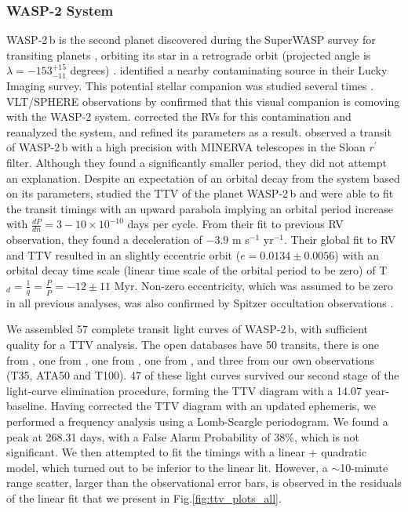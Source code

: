 \documentclass[a4paper,fleqn,usenatbib]{mnras}
\begin{document}
\subsubsection{WASP-2 System}
WASP-2\,b is the second planet discovered during the SuperWASP survey for transiting planets \citep{2007MNRAS.375..951C}, orbiting its star in a retrograde orbit (projected angle is $\lambda = -153^{+15}_{-11}$ degrees) \citep{2010A&A...524A..25T}. \cite{2009A&A...498..567D} identified a nearby contaminating source in their Lucky Imaging survey. This potential stellar companion was studied several times \citep{2013MNRAS.428..182B, 2015ApJ...800..138N,2015ApJ...814..148P, 2015A&A...575A..23W, 2016A&A...589A..58E}. VLT/SPHERE observations by \cite{2020A&A...635A..73B} confirmed that this visual companion is comoving with the WASP-2 system. \cite{2020A&A...635A..74S} corrected the RVs for this contamination and reanalyzed the system, and refined its parameters as a result. \cite{2019PASP..131k5003A} observed a transit of WASP-2\,b with a high precision with MINERVA telescopes in the Sloan $r^{\prime}$ filter. Although they found a significantly smaller period, they did not attempt an explanation. Despite an expectation of an orbital decay from the system based on its parameters, \cite{2019MNRAS.490.1294B} studied the TTV of the planet WASP-2\,b and were able to fit the transit timings with an upward parabola implying an orbital period increase with $\frac{dP}{dn} = 3 - 10 \times 10^{-10}$ days per cycle. From their fit to previous RV observation, they found a deceleration of $-3.9$ m s$^{-1}$ yr$^{-1}$. Their global fit to RV and TTV resulted in an slightly eccentric orbit  ($e = 0.0134 \pm 0.0056$) with an orbital decay time scale (linear time scale of the orbital period to be zero) of T$_{d} = \frac{1}{q} = \frac{P}{\dot P} = -12 \pm 11$ Myr. Non-zero eccentricity, which was assumed to be zero in all previous analyses, was also confirmed by Spitzer occultation observations \citep{2010arXiv1004.0836W}.

We assembled 57 complete transit light curves of WASP-2\,b, with sufficient quality for a TTV analysis. The open databases have 50 transits, there is one from  \cite{2019PASP..131k5003A}, one from \cite{2017MNRAS.472.3871T}, one from \cite{2007ApJ...658.1322C}, one from \cite{2020AcAT....1...13I}, and three from our own observations (T35, ATA50 and T100). 47 of these light curves survived our second stage of the light-curve elimination procedure, forming the TTV diagram with a 14.07 year-baseline. Having corrected the TTV diagram with an updated ephemeris, we performed a frequency analysis using a Lomb-Scargle periodogram. We found a peak at 268.31 days, with a False Alarm Probability of 38\%, which is not significant. We then attempted to fit the timings with a linear + quadratic model, which turned out to be inferior to the linear lit. However, a $\sim$10-minute range scatter, larger than the observational error bars, is observed in the residuals of the linear fit that we present in Fig.\ref{fig:ttv_plots_all}.
\end{document}
